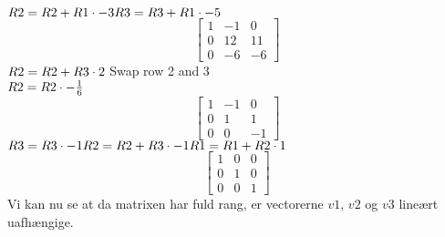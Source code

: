 $
	R2 = R2 + R1 \cdot -3\\
	R3 = R3 + R1 \cdot -5\\
$
\begin{equation*}
\begin{bmatrix}
1 & -1 & 0\\
0 & 12 & 11\\
0 & -6 & -6
\end{bmatrix}
\end{equation*}
$
	R2 = R2 + R3 \cdot 2\\
	$
	Swap row 2 and 3\\
	$
	R2 = R2 \cdot -\frac{1}{6}\\
$
\begin{equation*}
\begin{bmatrix}
1 & -1 & 0\\
0 & 1 & 1\\
0 & 0 & -1
\end{bmatrix}
\end{equation*}
$
	R3 = R3 \cdot -1\\
	R2 = R2 + R3 \cdot -1\\
	R1 = R1 + R2 \cdot 1\\
$
\begin{equation*}
\begin{bmatrix}
1 & 0 & 0\\
0 & 1 & 0\\
0 & 0 & 1
\end{bmatrix}
\end{equation*}
Vi kan nu se at da matrixen har fuld rang, er vectorerne $v1$, $v2$ og $v3$
lineært uafhængige.

